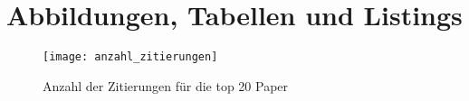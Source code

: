
%

\newpage
\appendix

\chapter{Abbildungen, Tabellen und Listings}\label{ch:results}

\begin{figure}[ht]

    \texttt{[image: anzahl\_zitierungen]}
  \caption[]{Anzahl der Zitierungen für die top 20 Paper}
\label{fig:paperrank}
\end{figure}




